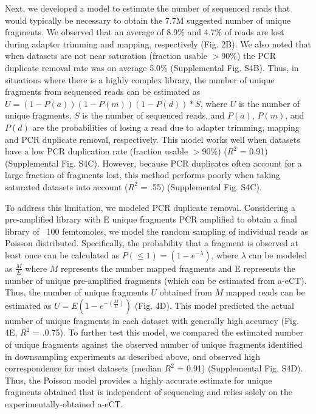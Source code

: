 Next, we developed a model to estimate the number of sequenced reads that would typically be necessary to obtain the 7.7M suggested number of unique fragments. We observed that an average of 8.9\% and 4.7\% of reads are lost during adapter trimming and mapping, respectively (Fig. 2B). We also noted that when datasets are not near saturation (fraction usable $>$90\%) the PCR duplicate removal rate was on average 5.0\% (Supplemental Fig. S4B). Thus, in situations where there is a highly complex library, the number of unique fragments from sequenced reads can be estimated as $U=(1-P(a))(1-P(m))(1-P(d))*S$, where $U$ is the number of unique fragments, $S$ is the number of sequenced reads, and $P(a)$, $P(m)$, and $P(d)$ are the probabilities of losing a read due to adapter trimming, mapping and PCR duplicate removal, respectively. This model works well when datasets have a low PCR duplication rate (fraction usable $>$90\%) ($R^2$ = 0.91) (Supplemental Fig. S4C). However, because PCR duplicates often account for a large fraction of fragments lost, this method performs poorly when taking saturated datasets into account ($R^2$ = .55) (Supplemental Fig. S4C).

To address this limitation, we modeled PCR duplicate removal. Considering a pre-amplified library with E unique fragments PCR amplified to obtain a final library of ~100 femtomoles, we model the random sampling of individual reads as Poisson distributed. Specifically, the probability that a fragment is observed at least once can be calculated as $P(\leq1)=(1-e^{-\lambda})$, where $\lambda$ can be modeled as $\frac{M}{E}$ where $M$ represents the number mapped fragments and E represents the number of unique pre-amplified fragments (which can be estimated from a-eCT). Thus, the number of unique fragments $U$ obtained from $M$ mapped reads can be estimated as $U=E(1-e^{-(\frac{M}{E})})$ (Fig. 4D). This model predicted the actual number of unique fragments in each dataset with generally high accuracy (Fig. 4E, $R^2$ = .0.75). To further test this model, we compared the estimated number of unique fragments against the observed number of unique fragments identified in downsampling experiments as described above, and observed high correspondence for most datasets (median $R^2$ = 0.91) (Supplemental Fig. S4D). Thus, the Poisson model provides a highly accurate estimate for unique fragments obtained that is independent of sequencing and relies solely on the experimentally-obtained a-eCT.

